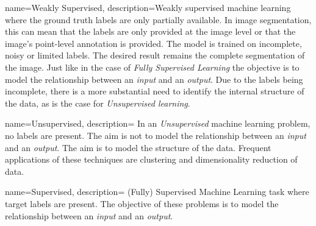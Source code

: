 
{
        name={Weakly Supervised},
        description={Weakly supervised machine learning where the ground truth labels are only partially available. 
        In image segmentation, this can mean that the labels are only provided at the image level or that the image's point-level annotation is provided.
        The model is trained on incomplete, noisy or limited labels. The desired result remains the complete segmentation of the image.
        Just like in the case of \textit{Fully Supervised Learning} the objective is to model the relationship between an \textit{input} and an \textit{output}. 
        Due to the labels being incomplete, there is a more substantial need to identify the internal structure of the data, as is the case for \textit{Unsupervised learning}.
        }
}




{
        name={Unsupervised},
        description={
                In an \textit{Unsupervised} machine learning problem, no labels are present. 
                The aim is not to model the relationship between an \textit{input} and an \textit{output}. The aim is to model the structure of the data.
                Frequent applications of these techniques are clustering and dimensionality reduction of data. 
                }
}

{
        name={Supervised},
        description={
                (Fully) Supervised Machine Learning task where target labels are present. 
                The objective of these problems is to model the relationship between an \textit{input} and an \textit{output}.
                }
}

